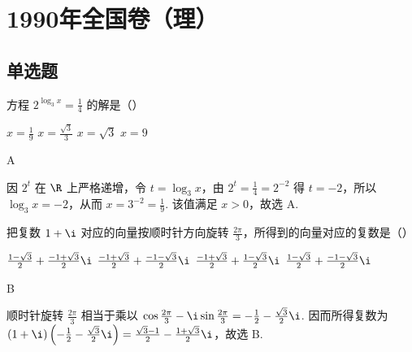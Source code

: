 \documentclass[UTF8,a4paper,oneside,11pt]{ctexbook}
\begin{document}
\mainmatter


\chapter{1990年全国卷（理）}
\section{单选题}

\begin{problem}
方程 \(2^{\log_3 x}=\frac{1}{4}\) 的解是（\quad）

\choices
    {\(x=\frac{1}{9}\)}
    {\(x=\frac{\sqrt{3}}{3}\)}
    {\(x=\sqrt{3}\)}
    {\(x=9\)}

\begin{answer}
A
\end{answer}

\begin{solution}
因 \(2^t\) 在 \(\R\) 上严格递增，令 \(t=\log_3 x\)，由 \(2^t=\frac{1}{4}=2^{-2}\) 得 \(t=-2\)，所以 \(\log_3 x=-2\)，从而 \(x=3^{-2}=\frac{1}{9}\). 该值满足 \(x>0\)，故选 A.
\end{solution}
\end{problem}

\begin{problem}
把复数 \(1+\i\) 对应的向量按顺时针方向旋转 \(\frac{2\pi}{3}\)，所得到的向量对应的复数是（\quad）

\choices
    {\(\frac{1-\sqrt{3}}{2}+\frac{-1+\sqrt{3}}{2}\i\)}
    {\(\frac{-1+\sqrt{3}}{2}+\frac{-1-\sqrt{3}}{2}\i\)}
    {\(\frac{-1+\sqrt{3}}{2}+\frac{1-\sqrt{3}}{2}\i\)}
    {\(\frac{1-\sqrt{3}}{2}+\frac{-1-\sqrt{3}}{2}\i\)}

\begin{answer}
B
\end{answer}

\begin{solution}
顺时针旋转 \(\frac{2\pi}{3}\) 相当于乘以 \(\cos\frac{2\pi}{3}-\i\sin\frac{2\pi}{3}=-\frac{1}{2}-\frac{\sqrt{3}}{2}\i\). 因而所得复数为 \((1+\i)\left(-\frac{1}{2}-\frac{\sqrt{3}}{2}\i\right)=\frac{\sqrt{3}-1}{2}-\frac{1+\sqrt{3}}{2}\i\)，故选 B.
\end{solution}
\end{problem}
\end{document}
